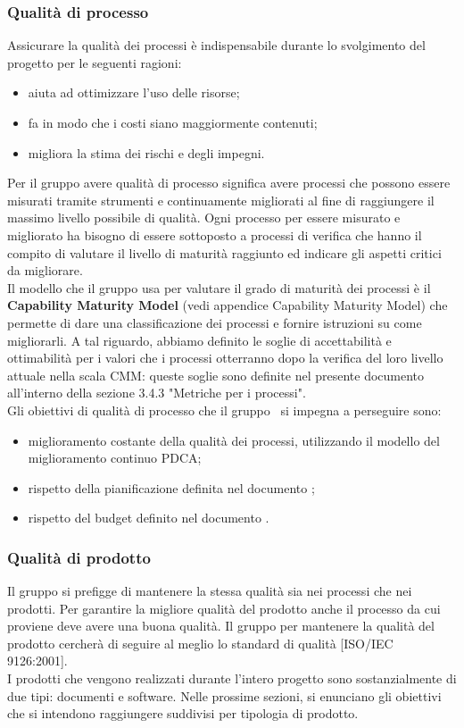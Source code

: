 \documentclass[../PianoDiQualifica.tex]{subfiles}
\begin{document}
		\subsubsection{Qualità di processo}
		Assicurare la qualità dei processi è indispensabile durante lo svolgimento del progetto per le seguenti ragioni:
		\begin{itemize}
		\item aiuta ad ottimizzare l'uso delle risorse;
		\item fa in modo che i costi siano maggiormente contenuti;
		\item migliora la stima dei rischi e degli impegni.
		\end{itemize}
		Per il gruppo avere qualità di processo significa avere processi che possono essere misurati tramite strumenti e continuamente migliorati al fine di raggiungere il massimo livello possibile di qualità. Ogni processo per essere misurato e migliorato ha bisogno di essere sottoposto a processi di verifica che hanno il compito di valutare il livello di maturità raggiunto ed indicare gli aspetti critici da migliorare.\\
		Il modello che il gruppo usa per valutare il grado di maturità dei processi è il \textbf{Capability Maturity Model} (vedi appendice Capability Maturity Model) che permette di dare una classificazione dei processi e fornire istruzioni su come migliorarli. A tal riguardo, abbiamo definito le soglie di accettabilità e ottimabilità per i valori che i processi otterranno dopo la verifica del loro livello attuale nella scala CMM: queste soglie sono definite nel presente documento all'interno della sezione 3.4.3 "Metriche per i processi".\\
		Gli obiettivi di qualità di processo che il gruppo \leaf\ si impegna a perseguire sono:
		\begin{itemize}
			\item miglioramento costante della qualità dei processi, utilizzando il modello del miglioramento continuo PDCA;
			\item rispetto della pianificazione definita nel documento \pianodiprogettov;
			\item rispetto del budget definito nel documento \pianodiprogettov.
		\end{itemize}
		\subsubsection{Qualità di prodotto}
		Il gruppo si prefigge di mantenere la stessa qualità sia nei processi che nei prodotti. Per garantire la migliore qualità del prodotto anche il processo da cui proviene deve avere una buona qualità. Il gruppo per mantenere la qualità del prodotto cercherà di seguire al meglio lo standard di qualità [ISO/IEC 9126:2001].\\
		I prodotti che vengono realizzati durante l'intero progetto sono sostanzialmente di due tipi: documenti e software. Nelle prossime sezioni, si enunciano gli obiettivi che si intendono raggiungere suddivisi per tipologia di prodotto.
\end{document}
